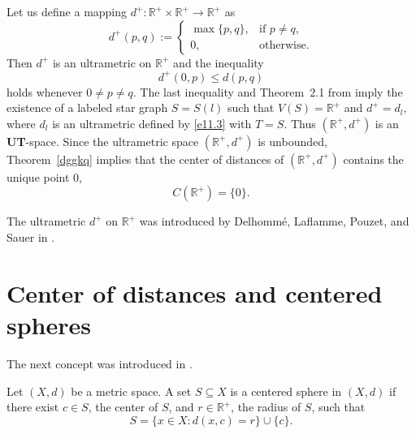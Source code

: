 \documentclass{article}
\begin{document}
\begin{Example}\label{xi}
 Let us define a mapping
\(
d^{+} : \mathbb{R}^{+} \times \mathbb{R}^{+} \to \mathbb{R}^{+}
\)
as
\begin{equation*}
d^{+}(p,q):=
\begin{cases}
\max\{p,q\}, & \text{if } p\neq q,\\
0, & \text{otherwise}.
\end{cases}
\end{equation*}
Then $d^{+}$ is an ultrametric on $\mathbb{R}^{+}$ and the inequality
\[
d^{+}(0,p)\le d(p,q)
\]
holds whenever $0\neq p\neq q$. The last inequality and Theorem~2.1 from \cite{DR2025USGbLSG} imply the existence of a labeled star graph $S=S(l)$ such that $V(S)=\mathbb R^+$ and $d^+=d_l$, where $d_l$ is an ultrametric defined by \eqref{e11.3} with $T=S$. Thus $(\mathbb{R}^+, d^+)$ is an {\bf UT}-space.
Since the ultrametric space $(\mathbb{R}^+, d^+)$ is unbounded, Theorem~\ref{dggkq} implies that the center of distances of $(\mathbb{R}^+, d^+)$ contains the unique point $0$, 
\[
C(\mathbb{R}^+) = \{0\}.
\]
\end{Example}




\begin{Remark}
The ultrametric $d^+$ on $\mathbb{R}^+$ was introduced by Delhommé, Laflamme, Pouzet, and Sauer in \cite{DLPS2008TaiA}.
\end{Remark}





\section{Center of distances and centered spheres}\label{sec4}


The next concept was introduced in \cite{DK2022LTGCCaDUS}.

\begin{Definition}\label{gla83}
Let $(X,d)$ be a metric space.
A set $S \subseteq X$ is a centered sphere in $(X,d)$ if there exist
$c \in S$, the center of $S$, and $r \in \mathbb{R}^+$, the radius of $S$, such that
\begin{equation}
    \label{ijgt}
S = \{x \in X : d(x,c) = r\} \cup \{c\}.
\end{equation}
\end{Definition}
\end{document}

